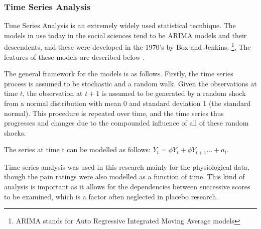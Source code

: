 \subsubsection{Time Series Analysis}

Time Series Analysis is an extremely widely used statistical tecnhique.  The models in use today in the social sciences tend to be ARIMA models and their descendents, and these were developed in the 1970's by Box and Jenkins\cite{box1970time}.  \footnote{ARIMA stands for Auto Regressive Integrated Moving Average models}, The features of these models are described below \cite{mccleary1980applied}.

The general framework for the models is as follows. Firstly, the time series process is assumed to be stochastic and a random walk. Given the observations at time $t$, the observation at $t+1$ is assumed to be generated by a random shock from a normal distribution with mean 0 and standard deviation 1 (the standard normal). This procedure is repeated over time, and the time series thus progresses and changes due to the compounded influence of all of these random shocks.

The series at time t can be modelled as follows: $Y_t=\phi Y_t+\phi Y_{t+1}\ldots+a_t$.

Time series analysis was used in this research mainly for the physiological data, though the pain ratings were also modelled as a function of time. This kind of analysis is important as it allows for the dependencies between successive scores to be examined, which is a factor often neglected in placebo research. 




